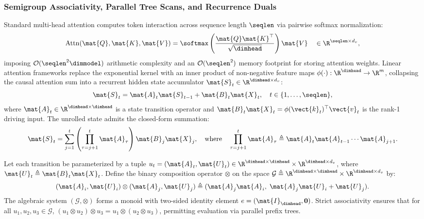 \subsubsection{Semigroup Associativity, Parallel Tree Scans, and Recurrence Duals}
Standard multi-head attention \cite{vaswani2017attention} computes token interaction across sequence length $\seqlen$ via pairwise softmax normalization:
\begin{equation}
\operatorname{Attn}(\mat{Q}, \mat{K}, \mat{V}) = \softmax\left(\frac{\mat{Q} \mat{K}^\top}{\sqrt{\dimhead}}\right) \mat{V} \quad \in \R^{\seqlen \times d_v},
\label{eq:softmax_attention}
\end{equation}
imposing $\mathcal{O}(\seqlen^2 \dimmodel)$ arithmetic complexity and an $\mathcal{O}(\seqlen^2)$ memory footprint for storing attention weights. Linear attention frameworks \cite{katharopoulos2020transformers} replace the exponential kernel with an inner product of non-negative feature maps $\phi(\cdot): \R^{\dimhead} \to \R^{m}$, collapsing the causal attention sum into a recurrent hidden state accumulator $\mat{S}_t \in \R^{\dimhead \times d_v}$:
\begin{equation}
\mat{S}_t = \mat{A}_t \mat{S}_{t-1} + \mat{B}_t \mat{X}_t, \quad t \in \{1, \dots, \seqlen\},
\label{eq:linear_dynamical_system}
\end{equation}
where $\mat{A}_t \in \R^{\dimhead \times \dimhead}$ is a state transition operator and $\mat{B}_t \mat{X}_t = \phi(\vect{k}_t)^\top \vect{v}_t$ is the rank-1 driving input. The unrolled state admits the closed-form summation:
\begin{equation}
\mat{S}_t = \sum_{j=1}^t \left( \prod_{\tau=j+1}^t \mat{A}_\tau \right) \mat{B}_j \mat{X}_j, \quad \text{where} \quad \prod_{\tau=j+1}^t \mat{A}_\tau \triangleq \mat{A}_t \mat{A}_{t-1} \cdots \mat{A}_{j+1}.
\label{eq:unrolled_recurrence}
\end{equation}

\begin{definition}
\label{def:state_transition_monoid}
Let each transition be parameterized by a tuple $u_t = (\mat{A}_t, \mat{U}_t) \in \R^{\dimhead \times \dimhead} \times \R^{\dimhead \times d_v}$, where $\mat{U}_t \triangleq \mat{B}_t \mat{X}_t$. Define the binary composition operator $\otimes$ on the space $\mathcal{G} \triangleq \R^{\dimhead \times \dimhead} \times \R^{\dimhead \times d_v}$ by:
\begin{equation}
(\mat{A}_i, \mat{U}_i) \otimes (\mat{A}_j, \mat{U}_j) \triangleq (\mat{A}_j \mat{A}_i, \; \mat{A}_j \mat{U}_i + \mat{U}_j).
\label{eq:associative_binary_operator}
\end{equation}
The algebraic system $(\mathcal{G}, \otimes)$ forms a monoid with two-sided identity element $e = (\mat{I}_{\dimhead}, \mathbf{0})$. Strict associativity ensures that for all $u_1, u_2, u_3 \in \mathcal{G}$, $(u_1 \otimes u_2) \otimes u_3 = u_1 \otimes (u_2 \otimes u_3)$, permitting evaluation via parallel prefix trees.
\end{definition}

